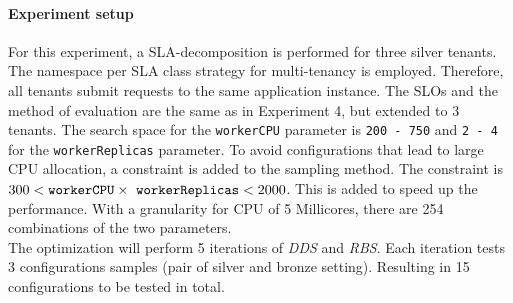 \paragraph{Experiment setup}
For this experiment, a SLA-decomposition is performed for three silver tenants. The namespace per SLA class strategy for multi-tenancy is employed. Therefore, all tenants submit requests to the same application instance. The SLOs and the method of evaluation are the same as in Experiment 4, but extended to 3 tenants. The search space for the \texttt{workerCPU} parameter is \texttt{200 - 750} and \texttt{2 - 4} for the \texttt{workerReplicas} parameter. To avoid configurations that lead to large CPU allocation, a constraint is added to the sampling method. The constraint is $ 300 < \text{\texttt{workerCPU}} \times \text{\space\texttt{workerReplicas}} < 2000$. This is added to speed up the performance. With a granularity for CPU of 5 Millicores, there are 254 combinations of the two parameters. \\
The optimization will perform 5 iterations of \textit{DDS} and \textit{RBS}. Each iteration tests 3 configurations samples (pair of silver and bronze setting). Resulting in 15 configurations to be tested in total.

